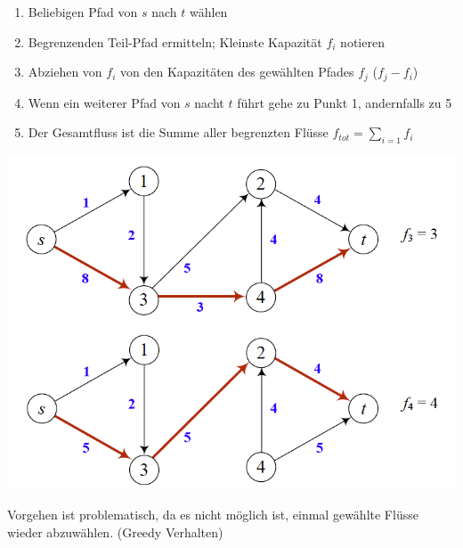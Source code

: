 \begin{minipage}{0.7\textwidth}
	\begin{enumerate}
		\item Beliebigen Pfad von $s$ nach $t$ wählen
		\item Begrenzenden Teil-Pfad ermitteln; Kleinste Kapazität $f_i$ notieren
		\item Abziehen von $f_i$ von den Kapazitäten des gewählten Pfades $f_j$ ($f_j-f_i$)
		\item Wenn ein weiterer Pfad von $s$ nacht $t$ führt gehe zu  Punkt 1, andernfalls zu 5
		\item Der Gesamtfluss ist die Summe aller begrenzten Flüsse $f_{tot} = \sum_{i=1} f_i$
	\end{enumerate}
\end{minipage}
\begin{minipage}{0.3\textwidth}
	\includegraphics[width=\textwidth]{Content/Graphen/augmentingPathMethode.png}
\end{minipage}


Vorgehen ist problematisch, da es nicht möglich ist, einmal gewählte Flüsse wieder abzuwählen. (Greedy Verhalten)



